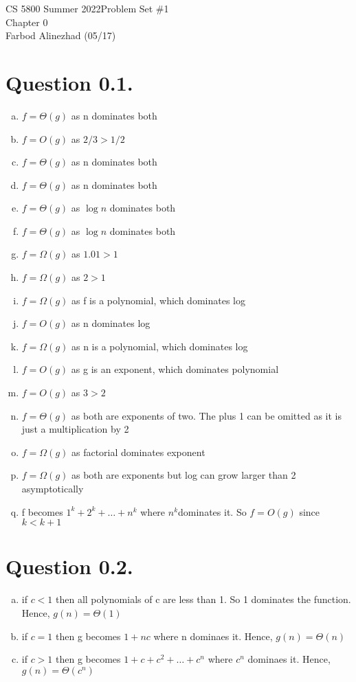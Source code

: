 

    CS 5800 Summer 2022\hfill Problem Set \#1\\
    Chapter 0\\
    Farbod Alinezhad (05/17)

    \hrulefill

    \tableofcontents
    \newpage


    \section{Question 0.1.}\label{sec:question-1}
    \begin{enumerate}[(a)]
        \item $f=\Theta(g)$ as n dominates both
        \item $f=O(g)$ as $2/3>1/2$
        \item $f=\Theta(g)$ as n dominates both
        \item $f=\Theta(g)$ as n dominates both
        \item $f=\Theta(g)$ as $\log{n}$ dominates both
        \item $f=\Theta(g)$ as $\log{n}$ dominates both
        \item $f=\Omega(g)$ as $1.01>1$
        \item $f=\Omega(g)$ as $2>1$
        \item $f=\Omega(g)$ as f is a polynomial, which dominates log
        \item $f=O(g)$  as n dominates log
        \item $f=\Omega(g)$ as n is a polynomial, which dominates log
        \item $f=O(g)$ as g is an exponent, which dominates polynomial
        \item $f=O(g)$ as $3>2$
        \item $f=\Theta(g)$ as both are exponents of two. The plus 1 can be omitted as it is just a multiplication by 2
        \item $f=\Omega(g)$ as factorial dominates exponent
        \item $f=\Omega(g)$ as both are exponents but log can grow larger than 2 asymptotically
        \item f becomes $1^k+2^k+\dots+n^k$ where $n^k$dominates it. So $f=O(g)$ since $k<k+1$
    \end{enumerate}
    \newpage


    \section{Question 0.2.}\label{sec:question-2}
    \begin{enumerate}[(a)]
        \item if $c<1$ then all polynomials of c are less than 1. So 1 dominates the function. Hence, $g(n) = \Theta(1)$
        \item if $c=1$ then g becomes $1+nc$ where n dominaes it. Hence, $g(n) = \Theta(n)$
        \item if $c>1$ then g becomes $1+c+c^2+\dots+c^n$ where $c^n$ dominaes it. Hence, $g(n) = \Theta(c^n)$

    \end{enumerate}
    \newpage


